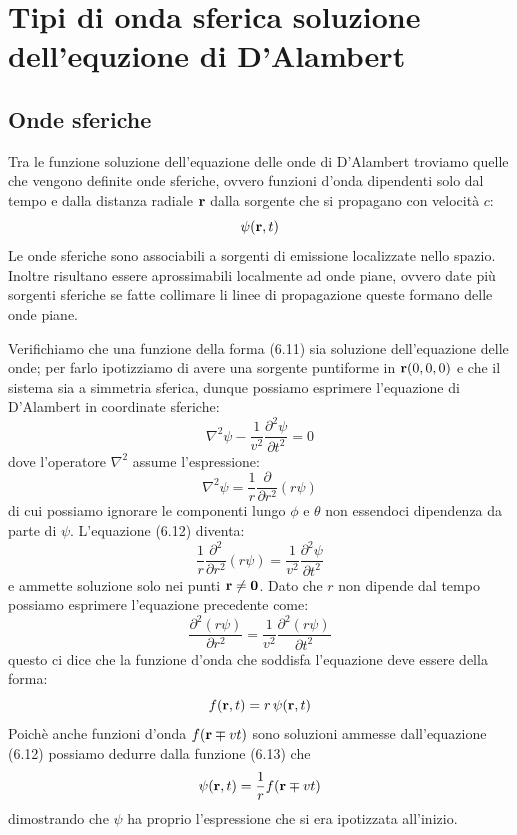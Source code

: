 \section{Tipi di onda sferica soluzione dell'equzione di D'Alambert }

\subsection{Onde sferiche }

Tra le funzione soluzione dell'equazione delle onde di D'Alambert troviamo quelle che vengono definite onde sferiche, ovvero funzioni d'onda dipendenti solo dal tempo e dalla distanza radiale $\bold{r}$ dalla sorgente che si propagano con velocit\`a $c$:
\begin{equation}
	\psi(\bold{r},t) 
\end{equation}
Le onde sferiche sono associabili a sorgenti di emissione localizzate nello spazio. Inoltre risultano essere aprossimabili localmente ad onde piane, ovvero date pi\`u sorgenti sferiche se fatte collimare li linee di propagazione queste formano delle onde piane.

Verifichiamo che una funzione della forma (6.11) sia soluzione dell'equazione delle onde; per farlo ipotizziamo di avere una sorgente puntiforme in $\bold{r}(0,0,0)$ e che il sistema sia a simmetria sferica, dunque possiamo esprimere l'equazione di D'Alambert in coordinate sferiche:
\begin{equation}
	\nabla^2 \psi - \frac{1}{v^2} \frac{\partial^2 \psi }{\partial t^2} = 0
\end{equation}
dove l'operatore $\nabla^2$ assume l'espressione:
\begin{equation*}
	\nabla^2 \psi = \frac{1}{r}\frac{\partial}{\partial r^2}(r\psi)
\end{equation*}
di cui possiamo ignorare le componenti lungo $\phi$ e $\theta$ non essendoci dipendenza da parte di $\psi$. L'equazione (6.12) diventa:
\begin{equation*}
	\frac{1}{r}\frac{\partial^2}{\partial r^2}(r\psi) = \frac{1}{v^2} \frac{\partial^2 \psi }{\partial t^2}
\end{equation*}
e ammette soluzione solo nei punti $\bold{r} \neq \bm{0}$. Dato che $r$ non dipende dal tempo possiamo esprimere l'equazione precedente come:
\begin{equation*}
	\frac{\partial^2(r\psi)}{\partial r^2} = \frac{1}{v^2} \frac{\partial^2 (r\psi) }{\partial t^2}
\end{equation*}
questo ci dice che la funzione d'onda che soddisfa l'equazione deve essere della forma:
\begin{equation}
	f(\bold{r},t) = r \, \psi(\bold{r},t)
\end{equation}
Poich\`e anche funzioni d'onda $f(\bold{r} \mp vt)$ sono soluzioni ammesse dall'equazione (6.12) possiamo dedurre dalla funzione (6.13) che 
\begin{equation}
	\psi(\bold{r},t) = \frac{1}{r}f(\bold{r}\mp vt)
\end{equation}
dimostrando che $\psi$ ha proprio l'espressione che si era ipotizzata all'inizio.

